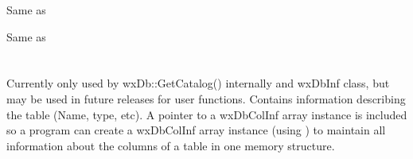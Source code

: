Same as 



\label{wxdbtableminusminus}


Same as 



\section{}\label{wxdbtableinf}

Currently only used by wxDb::GetCatalog() internally and wxDbInf class,
but may be used in future releases for  user functions.  Contains information
describing the table (Name, type, etc). A pointer to a wxDbColInf array 
instance is included so a program can create a wxDbColInf array instance
(using ) to maintain all information about the columns
of a table in one memory structure.

